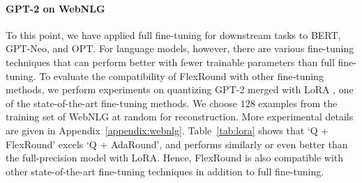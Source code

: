 \documentclass{article}
\theoremstyle{plain}
\theoremstyle{definition}
\theoremstyle{remark}
\begin{document}


\paragraph{GPT-2 on WebNLG} To this point, we have applied full fine-tuning for downstream tasks to BERT, GPT-Neo, and OPT. For language models, however, there are various fine-tuning techniques \citep{houlsby2019parameter, liu2022p, hu2022lora} that can perform better with fewer trainable parameters than full fine-tuning. 
To evaluate the compatibility of FlexRound with other fine-tuning methods, we perform experiments on quantizing GPT-2 merged with LoRA \citep{hu2022lora}, one of the state-of-the-art fine-tuning methods. We choose $128$ examples from the training set of WebNLG at random for reconstruction. More experimental details are given in Appendix~\ref{appendix:webnlg}. Table~\ref{tab:lora} shows that `Q + FlexRound' excels `Q + AdaRound', and performs similarly or even better than the full-precision model with LoRA. Hence, FlexRound is also compatible with other state-of-the-art fine-tuning techniques in addition to full fine-tuning.
\end{document}
